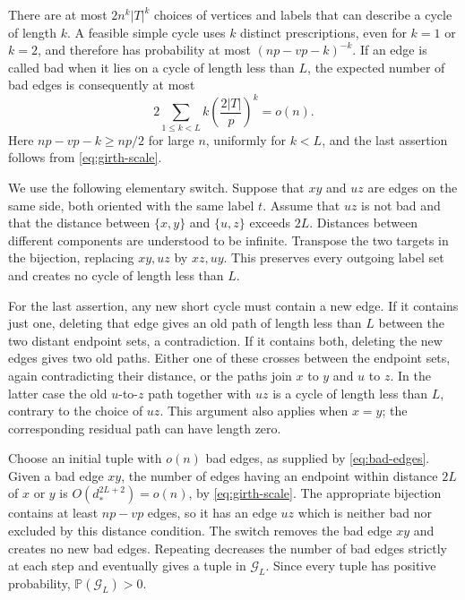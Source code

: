 There are at most \(2n^k|T|^k\) choices of vertices and labels that
can describe a cycle of length \(k\).  A feasible simple cycle uses
\(k\) distinct prescriptions, even for \(k=1\) or \(k=2\), and
therefore has probability at most \((np-vp-k)^{-k}\).  If an edge is
called bad when it lies on a cycle of length less than \(L\), the
expected number of bad edges is consequently at most
\begin{equation}\label{eq:bad-edges}
 2\sum_{1\le k<L} k\left(\frac{2|T|}{p}\right)^k=o(n).
\end{equation}
Here \(np-vp-k\ge np/2\) for large \(n\), uniformly for \(k<L\),
and the last assertion follows from \eqref{eq:girth-scale}.

We use the following elementary switch.  Suppose that \(xy\) and
\(uz\) are edges on the same side, both oriented with the same label
\(t\).  Assume that \(uz\) is not bad and that the distance between
\(\{x,y\}\) and \(\{u,z\}\) exceeds \(2L\).  Distances between
different components are understood to be infinite.  Transpose the
two targets in the bijection, replacing \(xy,uz\) by \(xz,uy\).
This preserves every outgoing label set and creates no cycle of length
less than \(L\).

For the last assertion, any new short cycle must contain a new edge.
If it contains just one, deleting that edge gives an old path of
length less than \(L\) between the two distant endpoint sets, a
contradiction.  If it contains both, deleting the new edges gives
two old paths.  Either one of these crosses between the endpoint
sets, again contradicting their distance, or the paths join \(x\)
to \(y\) and \(u\) to \(z\).  In the latter case the old
\(u\)-to-\(z\) path together with \(uz\) is a cycle of length
less than \(L\), contrary to the choice of \(uz\).  This argument
also applies when \(x=y\); the corresponding residual path can have
length zero.

Choose an initial tuple with \(o(n)\) bad edges, as supplied by
\eqref{eq:bad-edges}.  Given a bad edge \(xy\), the number of edges
having an endpoint within distance \(2L\) of \(x\) or \(y\) is
\(O(d_*^{2L+2})=o(n)\), by \eqref{eq:girth-scale}.  The appropriate
bijection contains at least \(np-vp\) edges, so it has an edge
\(uz\) which is neither bad nor excluded by this distance condition.
The switch removes the bad edge \(xy\) and creates no new bad edges.
Repeating decreases the number of bad edges strictly at each step
and eventually gives a tuple in \(\mathcal G_L\).  Since every
tuple has positive probability, \(\mathbb P(\mathcal G_L)>0\).

